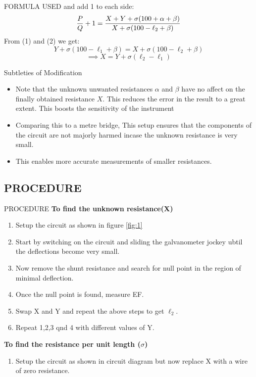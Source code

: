 \documentclass[aspectratio=169]{beamer}
\begin{document}
	\begin{frame}{FORMULA USED}
		and add 1 to each side:
		\begin{equation}
			{\displaystyle {P \over Q}+1={{X+Y+\sigma (100+\alpha +\beta )} \over {X+\sigma (100-\ell _{2}+\beta )}}}
		\end{equation}
		From (1) and (2) we get:
		\begin{equation*}
			{Y+\sigma (100-\ell _{1}+\beta )=X+\sigma (100-\ell _{2}+\beta )}
		\end{equation*}
		\begin{equation}
			{\implies X= Y+ \sigma (\ell _{2}-\ell _{1})}
		\end{equation}
	\end{frame}
	\begin{frame}{Subtleties of Modification}
		\begin{itemize}
			\item Note that the unknown unwanted resistances $\alpha$ and $\beta$ have no affect on the finally obtained resistance $X$. This reduces the error in the result to a great extent.
			This boosts the sensitivity of the instrument 
			\item Comparing this to a metre bridge, This setup ensures that the components of the circuit are not majorly harmed incase the unknown resistance is very small.
			\item This enables more accurate measurements of smaller resistances.
		\end{itemize}
	\end{frame}
	\subsection{PROCEDURE}
	\begin{frame}{PROCEDURE}
		\textbf{To find the unknown resistance(X)}
		\begin{enumerate}
			\item Setup the circuit as shown in figure \ref{fig:1}
			\item Start by switching on the circuit and sliding the galvanometer jockey ubtil the deflections become very small.
			\item Now remove the shunt resistance and search for null point in the region of minimal deflection.
			\item Once the null point is found, measure EF.
			\item Swap X and Y and repeat the above steps to get $\ell_2$.
			\item Repeat 1,2,3 qnd 4 with different values of Y.
		\end{enumerate}
		\textbf{To find the resistance per unit length ($\sigma$)}
		\begin{enumerate}
			\item Setup the circuit as shown in circuit diagram but now replace X with a wire of zero resistance. 
		\end{enumerate}
	\end{frame}
\end{document}
